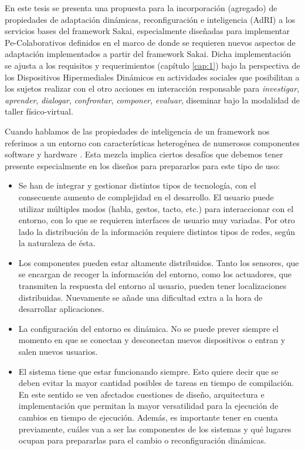 {En este tesis se presenta una propuesta para la incorporación (agregado) de
propiedades  de adaptación dinámicas, reconfiguración e inteligencia
(AdRI) \label{AdRI} a los servicios bases del framework Sakai,
especialmente diseñadas para implementar Pe-Colaborativos definidos en el marco
de \cite{cacic2007.9} donde se requieren nuevos aspectos de adaptación
\cite{librounq} implementados a partir del framework Sakai. Dicha
implementación se ajusta a los requisitos y requerimientos
(capítulo \ref{cap:1}) bajo la perspectiva de los Dispositivos
Hipermediales
Dinámicos en actividades sociales que posibilitan a los sujetos realizar con el
otro acciones en interacción responsable para \textit{investigar},
\textit{aprender}, \textit{dialogar}, \textit{confrontar}, \textit{componer},
\textit{evaluar}, diseminar bajo la modalidad de taller físico-virtual.  

Cuando hablamos de las propiedades de inteligencia de un framework nos
referimos a un entorno con características  heterogénea de numerosos
componentes software y hardware \cite{cap1.133}. Esta mezcla implica ciertos
desafíos que debemos tener presente especialmente en los diseños para
prepararlos para este tipo de uso:


\begin{itemize} 
 
\item
Se han de integrar y gestionar distintos tipos de tecnología, con
el consecuente aumento de complejidad en el desarrollo. El usuario puede
utilizar múltiples modos (habla, gestos, tacto, etc.) para interaccionar con
el entorno, con lo que se requieren interfaces de usuario muy variadas. Por
otro lado la distribución de la información requiere distintos tipos de redes,
según la naturaleza de ésta.

\item
Los componentes pueden estar altamente distribuidos. Tanto los
sensores, que se encargan de recoger la información del entorno, como los
actuadores, que transmiten la respuesta del entorno al usuario, pueden
tener localizaciones distribuidas. Nuevamente se añade una dificultad extra a la
hora de desarrollar aplicaciones.

\item
La configuración del entorno es dinámica. No se puede prever siempre
el momento en que se conectan y desconectan nuevos dispositivos o entran
y salen nuevos usuarios.

\item
El sistema tiene que estar funcionando siempre. Esto quiere decir que se
deben evitar la mayor cantidad posibles de tareas en tiempo de compilación. En
este sentido se ven afectados cuestiones de diseño, arquitectura e
implementación que permitan la mayor versatilidad para la ejecución de
cambios en tiempo de ejecución. Además, es importante tener en cuenta
previamente, cuáles van a ser las componentes de los sistemas y qué lugares
ocupan para prepararlas para el cambio o reconfiguración dinámicas. 


\end{itemize}}
